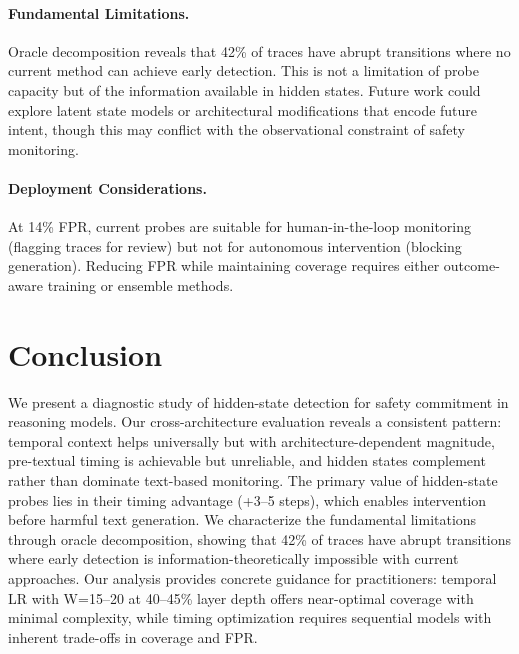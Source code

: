 \documentclass[11pt,a4paper]{article}
\begin{document}
\paragraph{Fundamental Limitations.} Oracle decomposition reveals that 42\% of traces have abrupt transitions where no current method can achieve early detection. This is not a limitation of probe capacity but of the information available in hidden states. Future work could explore latent state models or architectural modifications that encode future intent, though this may conflict with the observational constraint of safety monitoring.

\paragraph{Deployment Considerations.} At 14\% FPR, current probes are suitable for human-in-the-loop monitoring (flagging traces for review) but not for autonomous intervention (blocking generation). Reducing FPR while maintaining coverage requires either outcome-aware training or ensemble methods.

\section{Conclusion}

We present a diagnostic study of hidden-state detection for safety commitment in reasoning models. Our cross-architecture evaluation reveals a consistent pattern: temporal context helps universally but with architecture-dependent magnitude, pre-textual timing is achievable but unreliable, and hidden states complement rather than dominate text-based monitoring. The primary value of hidden-state probes lies in their timing advantage (+3--5 steps), which enables intervention before harmful text generation. We characterize the fundamental limitations through oracle decomposition, showing that 42\% of traces have abrupt transitions where early detection is information-theoretically impossible with current approaches. Our analysis provides concrete guidance for practitioners: temporal LR with W=15--20 at 40--45\% layer depth offers near-optimal coverage with minimal complexity, while timing optimization requires sequential models with inherent trade-offs in coverage and FPR.
\end{document}
